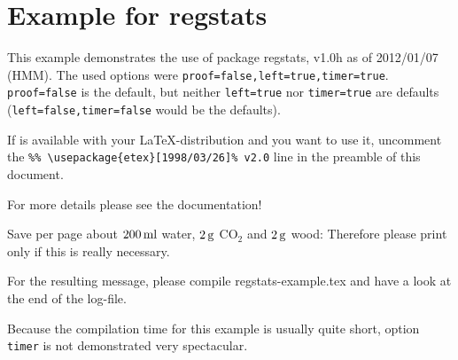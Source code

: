 \documentclass[british]{article}[2007/10/19]%
\gdef\unit#1{\mathord{\thinspace\mathrm{#1}}}%
\begin{document}
\section*{Example for regstats}

This example demonstrates the use of package\newline
\textsf{regstats}, v1.0h as of 2012/01/07 (HMM).\newline
The used options were \texttt{proof=false,left=true,timer=true}.\newline
\texttt{proof=false} is the default, but neither \texttt{left=true}
nor \texttt{timer=true} are defaults (\texttt{left=false,timer=false}
would be the defaults).\newline

If \eTeX{} is available with your \LaTeX{}-distribution
and you want to use it, uncomment the\newline
\verb|%% \usepackage{etex}[1998/03/26]% v2.0|\newline
line in the preamble of this document.\newline

For more details please see the documentation!\newline

\noindent Save per page about $200\unit{ml}$ water,
$2\unit{g}$ CO$_{2}$ and $2\unit{g}$ wood:\newline
Therefore please print only if this is really necessary.\newline

For the resulting message, please compile regstats-example.tex and
have a look at the end of the log-file.

Because the compilation time for this example is usually quite short,
option \texttt{timer} is not demonstrated very spectacular.
\end{document}
